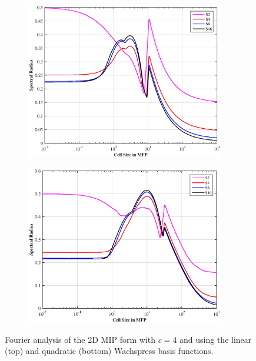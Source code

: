 \begin{figure}
\centering
	\begin{subfigure}[b]{0.80\textwidth}
		\centering
		\includegraphics[width=0.95\textwidth]{figures/sec_DSA/SI_MIP_quad_C=4_UWACHSPRESS1_LS.eps}
	\end{subfigure}
	\vfill
	\begin{subfigure}[b]{0.80\textwidth}
		\centering
		\includegraphics[width=0.95\textwidth]{figures/sec_DSA/SI_MIP_quad_C=4_UWACHSPRESS2_LS.eps}
	\end{subfigure}
\caption{Fourier analysis of the 2D MIP form with $c=4$ and using the linear (top) and quadratic (bottom) Wachspress basis functions.}
\label{fig::DSA_2D1G_Fourier_Wach}
\end{figure}


